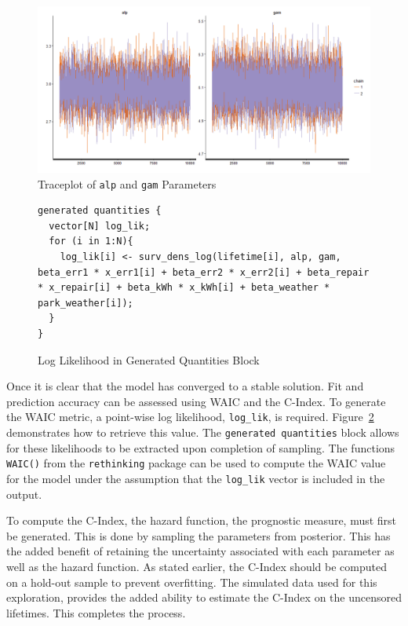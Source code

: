 \begin{figure}[htbp]
    \centering
    \includegraphics[width=350pt]{img/mhaz_traceplot}
    \caption{Traceplot of \lstinline{alp} and \lstinline{gam} Parameters}
    \label{mhaz_traceplot}
\end{figure}






\begin{figure}[htbp]
    \centering
    \begin{lstlisting}[belowskip=-2 \baselineskip]
generated quantities {
  vector[N] log_lik;
  for (i in 1:N){
  	log_lik[i] <- surv_dens_log(lifetime[i], alp, gam, beta_err1 * x_err1[i] + beta_err2 * x_err2[i] + beta_repair * x_repair[i] + beta_kWh * x_kWh[i] + beta_weather * park_weather[i]);
  }
}
\end{lstlisting}
    \caption{Log Likelihood in Generated Quantities Block}
    \label{mhaz_loglik}
\end{figure}



Once it is clear that the model has converged to a stable solution. Fit and prediction accuracy can be assessed using WAIC and the C-Index. To generate the WAIC metric, a point-wise log likelihood, \lstinline{log_lik}, is required. Figure~\ref{mhaz_loglik} demonstrates how to retrieve this value. The \lstinline{generated quantities} block allows for these likelihoods to be extracted upon completion of sampling. The functions \lstinline{WAIC()} from the \lstinline{rethinking} package can be used to compute the WAIC value for the model under the assumption that the \lstinline{log_lik} vector is included in the output. 

To compute the C-Index, the hazard function, the prognostic measure, must first be generated. This is done by sampling the parameters from posterior. This has the added benefit of retaining the uncertainty associated with each parameter as well as the hazard function. As stated earlier, the C-Index should be computed on a hold-out sample to prevent overfitting. The simulated data used for this exploration, provides the added ability to estimate the C-Index on the uncensored lifetimes. This completes the process.

